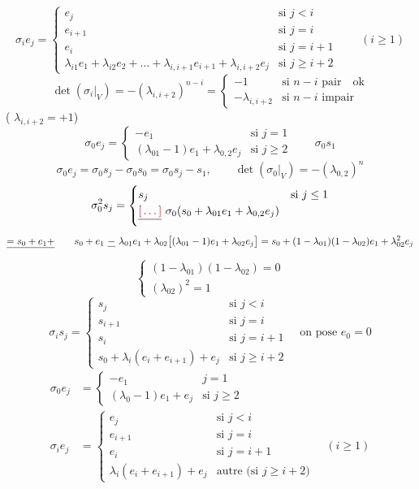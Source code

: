 \documentclass[11pt,a4paper]{article}
\begin{document}
\[
\sigma_i e_j =
\begin{cases}
e_j & \text{si } j<i \\
e_{i+1} & \text{si } j=i \\
e_i & \text{si } j=i+1 \\
\lambda_{i1}e_1+\lambda_{i2}e_2+\dots+\lambda_{i,i+1}e_{i+1}+\lambda_{i,i+2}e_j & \text{si } j\geq i+2
\end{cases}
\qquad (i\geq 1)
\]
\[
\det(\sigma_i|_V) = -(\lambda_{i,i+2})^{n-i} =
\begin{cases}
-1 & \text{si } n-i \text{ pair} \quad \text{ok} \\
-\lambda_{i,i+2} & \text{si } n-i \text{ impair}
\end{cases}
\]
(\ill{}  $\lambda_{i,i+2}=+1$)
\[
\sigma_0 e_j =
\begin{cases}
-e_1 & \text{si } j=1 \\
(\lambda_{01}-1)e_1+\lambda_{0,2}e_j & \text{si } j\geq 2
\end{cases}
\qquad \sigma_0 s_1
\]
\[
\sigma_0 e_j = \sigma_0 s_j-\sigma_0 s_0 = \sigma_0 s_j - s_1, \qquad \det(\sigma_0|_V) = -(\lambda_{0,2})^n
\]
\[
\sigma_0^2 s_j =
\begin{cases}
s_j & \text{si } j\leq 1 \\
\struck{\ill{}}\ \sigma_0(s_0+\lambda_{01}e_1+\lambda_{0,2}e_j)
\end{cases}
\]
\[
\struck{= s_0+e_1+}\qquad
s_0+e_1\ \uncertain{-}\ \lambda_{01}e_1+\lambda_{02}\bigl[(\lambda_{01}-1)e_1+\lambda_{02}e_j\bigr]
= s_0+(1-\lambda_{01})(1-\lambda_{02})e_1+\lambda_{02}^2e_j
\]
\[
\begin{cases}
(1-\lambda_{01})(1-\lambda_{02})=0 \\
(\lambda_{02})^2=1
\end{cases}
\]
\[
\boxed{\ \sigma_i s_j =
\begin{cases}
s_j & \text{si } j<i \\
s_{i+1} & \text{si } j=i \\
s_i & \text{si } j=i+1 \\
s_0+\lambda_i(e_i+e_{i+1})+e_j & \text{si } j\geq i+2
\end{cases}
\quad \text{on pose } e_0=0\ }
\]
\[
\boxed{\ \begin{aligned}
\sigma_0 e_j &=
\begin{cases}
-e_1 & j=1 \\
(\lambda_0-1)e_1+e_j & \text{si } j\geq 2
\end{cases} \\
\sigma_i e_j &=
\begin{cases}
e_j & \text{si } j<i \\
e_{i+1} & \text{si } j=i \\
e_i & \text{si } j=i+1 \\
\lambda_i(e_i+e_{i+1})+e_j & \text{autre (si } j\geq i+2)
\end{cases}
\quad (i\geq 1)
\end{aligned}\ }
\]
\end{document}
